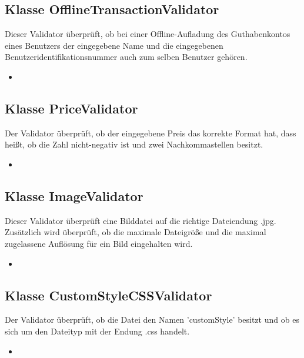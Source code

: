 	\subsection{Klasse OfflineTransactionValidator}
	Dieser Validator überprüft, ob bei einer Offline-Aufladung des Guthabenkontos eines Benutzers der eingegebene Name und die eingegebenen Benutzeridentifikationsnummer auch zum selben Benutzer gehören.
	\begin{itemize}
		\item \override
	\end{itemize}
	
	\subsection{Klasse PriceValidator}
	Der Validator überprüft, ob der eingegebene Preis das korrekte Format hat, dass heißt, ob die Zahl nicht-negativ ist und zwei Nachkommastellen besitzt.
	\begin{itemize}
		\item \override
	\end{itemize}
	
	\subsection{Klasse ImageValidator}
	Dieser Validator überprüft eine Bilddatei auf die richtige Dateiendung .jpg. Zusätzlich wird überprüft, ob
	die maximale Dateigröße und die maximal zugelassene Auflösung für ein Bild eingehalten wird.
	\begin{itemize}
		\item \override
	\end{itemize}
	
	\subsection{Klasse CustomStyleCSSValidator}
	Der Validator überprüft, ob die Datei den Namen 'customStyle' besitzt und ob es sich um den Dateityp mit der Endung .css handelt.
	\begin{itemize}
		\item \override
	\end{itemize}
		
